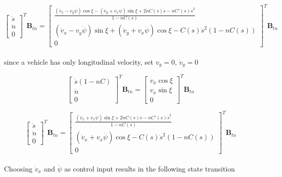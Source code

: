 \begin{equation}
	\begin{bmatrix}
		\ddot{s} \\
		\ddot{n} \\
		0
	\end{bmatrix}^T \mathbf{B}_{tn} = \begin{bmatrix}
		\frac{
			(\dot{v}_x - v_y\dot{\psi})\cos{\xi} - (\dot{v}_y + v_x\dot{\psi})\sin{\xi} +
			2\dot{n}C(s)\dot{s}-nC'(s)\dot{s}^2
		} {
			1-nC(s)
		}                      \\
		(\dot{v}_x - v_y\dot{\psi})\sin{\xi} + (\dot{v}_y + v_x\dot{\psi})\cos{\xi} -
		C(s)\dot{s}^2(1-nC(s)) \\
		0
	\end{bmatrix}^T \mathbf{B}_{tn}
\end{equation}
\\
since a vehicle has only longitudinal velocity, set $v_y=0$, $\dot{v}_y=0$

\begin{equation}
	\label{velocity-mapping-vx}
	\begin{bmatrix}
		\dot{s}(1-nC) \\
		\dot{n}       \\
		0
	\end{bmatrix}^T \mathbf{B}_{tn} = \begin{bmatrix}
		v_x\cos{\xi} \\
		v_x\sin{\xi} \\
		0
	\end{bmatrix}^T \mathbf{B}_{tn}
\end{equation}

\begin{equation}
	\begin{bmatrix}
		\ddot{s} \\
		\ddot{n} \\
		0
	\end{bmatrix}^T \mathbf{B}_{tn} = \begin{bmatrix}
		\frac{
			(\dot{v}_x + v_x\dot{\psi})\sin{\xi} +
			2\dot{n}C(s)\dot{s}-nC'(s)\dot{s}^2
		} {
			1-nC(s)
		}                      \\
		(\dot{v}_x + v_x\dot{\psi})\cos{\xi} -
		C(s)\dot{s}^2(1-nC(s)) \\
		0
	\end{bmatrix}^T \mathbf{B}_{tn}
\end{equation}
\\
Choosing $\dot{v}_x$ and $\ddot{\psi}$ as control input results in the following state transition

